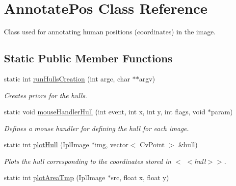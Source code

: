 \hypertarget{classAnnotatePos}{
\section{AnnotatePos Class Reference}
\label{classAnnotatePos}
}


Class used for annotating human positions (coordinates) in the image.  


\subsection*{Static Public Member Functions}
\begin{DoxyCompactItemize}
\item 
\hypertarget{classAnnotatePos_a920ff95a3e61f6da24786947b1dfe940}{
static int \hyperlink{classAnnotatePos_a920ff95a3e61f6da24786947b1dfe940}{runHullsCreation} (int argc, char $\ast$$\ast$argv)}
\label{classAnnotatePos_a920ff95a3e61f6da24786947b1dfe940}

\begin{DoxyCompactList}\small\item\em Creates priors for the hulls. \item\end{DoxyCompactList}\item 
\hypertarget{classAnnotatePos_ae0c30994de789ec4612f2df20308f486}{
static void \hyperlink{classAnnotatePos_ae0c30994de789ec4612f2df20308f486}{mouseHandlerHull} (int event, int x, int y, int flags, void $\ast$param)}
\label{classAnnotatePos_ae0c30994de789ec4612f2df20308f486}

\begin{DoxyCompactList}\small\item\em Defines a mouse handler for defining the hull for each image. \item\end{DoxyCompactList}\item 
\hypertarget{classAnnotatePos_a9aa31e7455b07c89dd19ac11cbe8e7f4}{
static int \hyperlink{classAnnotatePos_a9aa31e7455b07c89dd19ac11cbe8e7f4}{plotHull} (IplImage $\ast$img, vector$<$ CvPoint $>$ \&hull)}
\label{classAnnotatePos_a9aa31e7455b07c89dd19ac11cbe8e7f4}

\begin{DoxyCompactList}\small\item\em Plots the hull corresponding to the coordinates stored in {\ttfamily $<$} $<$hull$>$$>$. \item\end{DoxyCompactList}\item 
\hypertarget{classAnnotatePos_a386d9bc106b4b13a5c15007689702cd2}{
static int \hyperlink{classAnnotatePos_a386d9bc106b4b13a5c15007689702cd2}{plotAreaTmp} (IplImage $\ast$src, float x, float y)}
\label{classAnnotatePos_a386d9bc106b4b13a5c15007689702cd2}


\end{DoxyCompactItemize}
